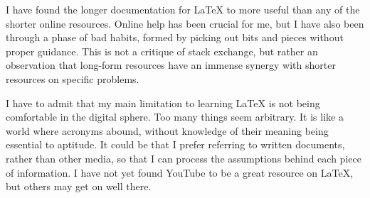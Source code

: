 \documentclass[11pt, oneside]{memoir}
\begin{document}
I have found the longer documentation for LaTeX to more useful than any of the shorter online resources. Online help has been crucial for me, but I have also been through a phase of bad habits, formed by picking out bits and pieces without proper guidance. This is not a critique of stack exchange, but rather an observation that long-form resources have an immense synergy with shorter resources on specific problems.

I have to admit that my main limitation to learning LaTeX is not being comfortable in the digital sphere. Too many things seem arbitrary. It is like a world where acronyms abound, without knowledge of their meaning being essential to aptitude. It could be that I prefer referring to written documents, rather than other media, so that I can process the assumptions behind each piece of information. I have not yet found YouTube to be a great resource on LaTeX, but others may get on well there.
\end{document}
